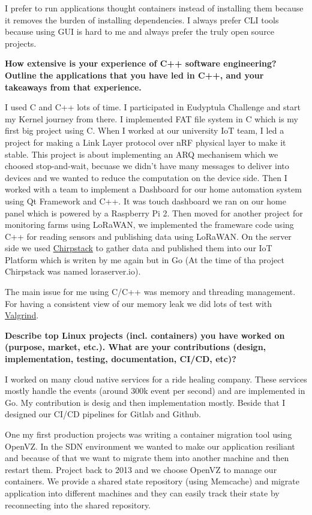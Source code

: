 I prefer to run applications thought containers instead of installing them because it removes the burden of installing
dependencies. I always prefer CLI tools because using GUI is hard to me and always prefer the truly open source projects.

\noindent
\textbf{How extensive is your experience of C++ software engineering? Outline the applications that you have led in C++,
and your takeaways from that experience.}

I used C and C++ lots of time.
I participated in Eudyptula Challenge and start my Kernel journey from there.
I implemented FAT file system in C which is my first big project using C. When I worked
at our university IoT team, I led a project for making a Link Layer protocol over nRF physical layer to make it stable.
This project is about implementing an ARQ mechanisem which we choosed stop-and-wait, becuase we didn't have many messages
to deliver into devices and we wanted to reduce the computation on the device side.
Then I worked with a team to implement a Dashboard for our home automation system using Qt Framework and C++. It was
touch dashboard we ran on our home panel which is powered by a Raspberry Pi 2.
Then moved for another project for monitoring farms using LoRaWAN, we implemented the frameware code using C++ for reading
sensors and publishing data using LoRaWAN. On the server side we used \href{https://www.chirpstack.io/}{Chirpstack}
to gather data and published them into our IoT Platform which is writen by me again but in Go
(At the time of tha project Chirpstack was named loraserver.io).

The main issue for me using C/C++ was memory and threading management.
For having a consistent view of our memory leak we did lots of test with \href{https://valgrind.org/}{Valgrind}.

\noindent
\textbf{Describe top Linux projects (incl. containers) you have worked on (purpose, market, etc.).
What are your contributions (design, implementation, testing, documentation, CI/CD, etc)?}

I worked on many cloud native services for a ride healing company. These services mostly handle the events (around
300k event per second) and are implemented in Go. My contribution is desig and then implementation mostly. Beside that
I designed our CI/CD pipelines for Gitlab and Github.

One my first production projects was writing a container migration tool using OpenVZ. In the SDN environment we wanted
to make our application resiliant and because of that we want to migrate them into another machine and then restart them.
Project back to 2013 and we choose OpenVZ to manage our containers. We provide a shared state repository (using Memcache)
and migrate application into different machines and they can easily track their state by reconnecting into the shared
repository.

